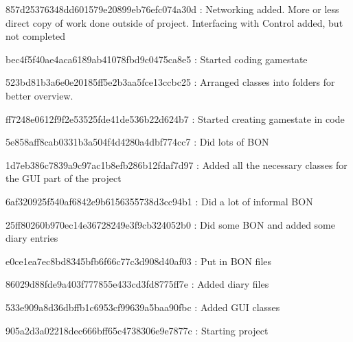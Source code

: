 857d25376348dd601579e20899eb76efc074a30d : Networking added. More or less direct copy of work done outside of project. Interfacing with Control added, but not completed

bec4f5f40ae4aca6189ab41078fbd9c0475ca8e5 : Started coding gamestate

523bd81b3a6e0e20185ff5e2b3aa5fce13ccbc25 : Arranged classes into folders for better overview.

ff7248e0612f9f2e53525fde41de536b22d624b7 : Started creating gamestate in code

5e858aff8cab0331b3a504f4d4280a4dbf774cc7 : Did lots of BON

1d7eb386c7839a9c97ac1b8efb286b12fdaf7d97 : Added all the necessary classes for the GUI part of the project

6af320925f540af6842e9b6156355738d3cc94b1 : Did a lot of informal BON

25ff80260b970ec14e36728249e3f9cb324052b0 : Did some BON and added some diary entries

e0ce1ea7ec8bd8345bfb6f66c77c3d908d40af03 : Put in BON files

86029d88fde9a403f777855e433cd3fd8775ff7e : Added diary files

533e909a8d36dbffb1c6953cf99639a5baa90fbc  : Added GUI classes 

905a2d3a02218dec666bff65c4738306e9e7877c : Starting project 
